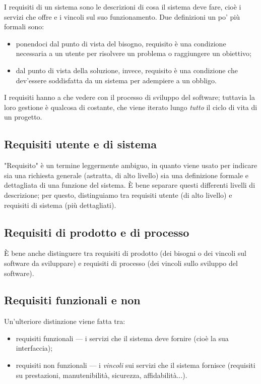 \documentclass[a4paper]{article}
\begin{document}
		
I requisiti di un sistema sono le descrizioni di cosa il sistema deve fare, cioè i servizi che offre e i vincoli sul suo funzionamento. Due definizioni un po' più formali sono:
		
	\begin{itemize}
		
			
	\item ponendoci dal punto di vista del bisogno, requisito è una condizione necessaria a un utente per risolvere un problema o raggiungere un obiettivo;
			
	\item dal punto di vista della soluzione, invece, requisito è una condizione che dev'essere soddisfatta da un sistema per adempiere a un obbligo.
		
	\end{itemize}

		
I requisiti hanno a che vedere con il processo di sviluppo del software; tuttavia la loro gestione è qualcosa di costante, che viene iterato lungo \emph{tutto} il ciclo di vita di un progetto.

		
	\subsection{Requisiti utente e di sistema}

		
"Requisito" è un termine leggermente ambiguo, in quanto viene usato per indicare sia una richiesta generale (astratta, di alto livello) sia una definizione formale e dettagliata di una funzione del sistema. È bene separare questi differenti livelli di descrizione; per questo, distinguiamo tra requisiti utente (di alto livello) e requisiti di sistema (più dettagliati).

		
	\subsection{Requisiti di prodotto e di processo}

		
È bene anche distinguere tra requisiti di prodotto (dei bisogni o dei vincoli sul software da sviluppare) e requisiti di processo (dei vincoli sullo sviluppo del software).

		
	\subsection{Requisiti funzionali e non}

		
Un'ulteriore distinzione viene fatta tra:
		
	\begin{itemize}
		
			
	\item requisiti funzionali --- i servizi che il sistema deve fornire (cioè la sua interfaccia);
			
	\item requisiti non funzionali --- i \emph{vincoli} sui servizi che il sistema fornisce (requisiti su prestazioni, manutenibilità, sicurezza, affidabilità...).
		
	\end{itemize}
\end{document}
